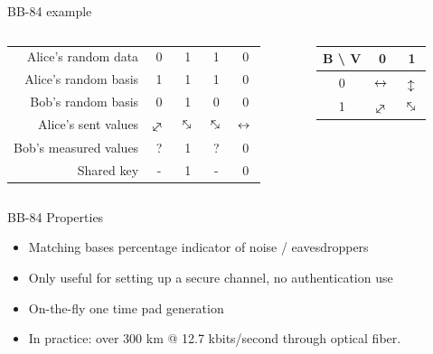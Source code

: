 \documentclass{beamer}
\newcommand{\myarrow}[1][-45]{%
  \mathrel{%
    \text{$
     \begin{tikzpicture}[baseline = -0.5ex]
       \node[inner sep=0pt,outer sep=0pt,rotate = #1] (a) at (0,0)  {$\leftrightarrow{}$};
    \end{tikzpicture}
    $}%
  }%
}%
\begin{document}
	\begin{frame}{BB-84 example} %
		\begin{columns}
			\begin{column}{0.7\textwidth}
				\begin{table}
					\begin{tabular}{r | c | c | c | c  }
						Alice's random data & 0 & 1 & 1 & 0 \\
						Alice's random basis & 1 & 1 & 1 & 0 \\
						Bob's random basis & 0 & 1 & 0 & 0 \\
						Alice's sent values & $\myarrow[45]$ & $\myarrow[-45]$ & $\myarrow[-45]$ & $\myarrow[0]$ \\
						Bob's measured values & ? & 1 & ? & 0 \\
						Shared key & - & 1 & - & 0 
					\end{tabular}
				\end{table}
			\end{column}
			\vrule{}
			\begin{column}{0.3\textwidth}
				\begin{table}
					\begin{tabular}{c | c  c}
						 B \textbackslash \; V & 0 & 1 \\
						  \hline
						0 & $\myarrow[0]$ & $\myarrow[90]$ \\
						1 & $\myarrow[45]$ & $\myarrow[-45]$ \\
					\end{tabular}
	
				\end{table}

			\end{column}
		\end{columns}
	\end{frame}
	
	\begin{frame}{BB-84 Properties} %
		\begin{itemize}
			\item Matching bases percentage indicator of noise / eavesdroppers
			\item Only useful for setting up a secure channel, no authentication use
			\item On-the-fly one time pad generation
			\item In practice: over 300 km @ 12.7 kbits/second through optical fiber.
		\end{itemize}
	\end{frame}
\end{document}

